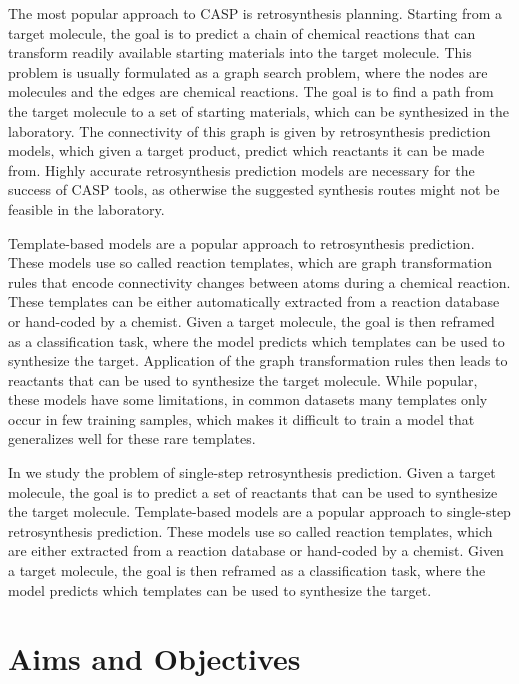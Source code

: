 The most popular approach to CASP is retrosynthesis planning. Starting from a
target molecule, the goal is to predict a chain of chemical reactions that can
transform readily available starting materials into the target molecule. This
problem is usually formulated as a graph search problem, where the nodes are
molecules and the edges are chemical reactions. The goal is to find a path from
the target molecule to a set of starting materials, which can be synthesized in
the laboratory. The connectivity of this graph is given by retrosynthesis
prediction models, which given a target product, predict which reactants it can
be made from. Highly accurate retrosynthesis prediction models are necessary for
the success of CASP tools, as otherwise the suggested synthesis routes might not
be feasible in the laboratory.

Template-based models are a popular approach to retrosynthesis prediction. These
models use so called reaction templates, which are graph transformation rules 
that encode connectivity changes between atoms during a chemical reaction. These 
templates can be either automatically extracted from a reaction database or
hand-coded by a chemist. Given a target molecule, the goal is then reframed as a
classification task, where the model predicts which templates can be used to
synthesize the target. Application of the graph transformation rules then leads
to reactants that can be used to synthesize the target molecule. While popular, 
these models have some limitations, in common datasets many templates only occur 
in few training samples, which makes it difficult to train a model that generalizes
well for these rare templates.

In \citep{seidlImprovingFewZeroShot2022} we study the problem of single-step
retrosynthesis prediction. Given a target molecule, the goal is to predict a
set of reactants that can be used to synthesize the target molecule.
Template-based models are a popular approach to single-step retrosynthesis
prediction. These models use so called reaction templates, which are
either extracted from a reaction database or hand-coded by a chemist.
Given a target molecule, the goal is then reframed as a classification task,
where the model predicts which templates can be used to synthesize the target.



\section{Aims and Objectives\label{sec:aims-objectives}}
